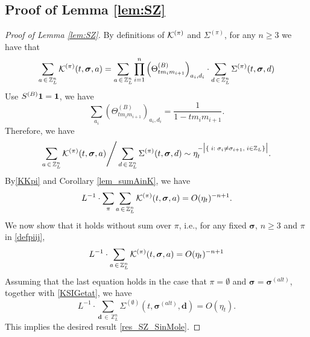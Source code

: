 \documentclass[10pt,reqno]{article}
\theoremstyle{plain} %
\theoremstyle{remark}
\numberwithin{equation}{section}
\begin{document}
\subsection{Proof of Lemma  \ref{lem:SZ}}



\begin{proof}[ Proof of Lemma  \ref{lem:SZ}]
By   definitions of ${\cal K}^{(\pi)}$ and $\Sigma^{(\pi)}$, for any $n\ge 3$ we have that 
\begin{equation} 
 \sum_{\textbf{a}\,\in \,\mathbb Z^{n}_L } 
{\cal K}^{(\pi)}(t, \boldsymbol{\sigma}, \textbf{a})
= \sum_{\textbf{a}\,\in \,\mathbb Z^{n}_L }  \prod_{i=1}^n \left(\Theta^{(B)}_{tm_im_{i+1}}\right)_{a_i,d_i}\cdot\sum_{\textbf{d}\,\in \,\mathbb Z^{n}_L } \Sigma^{(\pi)}(t, \boldsymbol{\sigma}, \textbf{d})    
\end{equation}
Use $S^{(B)} \bf 1 = \bf 1$,  we have  
$$
\sum_{a_i}\left(\Theta^{(B)}_{tm_im_{i+1}}\right)_{a_i,d_i}=\frac{1}{1-tm_im_{i+1}}.
$$
Therefore, we have 
\begin{equation}\label{KSIGetat}
 \sum_{\textbf{a}\,\in \,\mathbb Z^{n}_L } 
{\cal K}^{(\pi)}(t, \boldsymbol{\sigma}, \textbf{a})
 \Bigg/\sum_{\textbf{d}\,\in \,\mathbb Z^{n}_L } \Sigma^{(\pi)}(t, \boldsymbol{\sigma}, \textbf{d})    \sim \eta_t^{-\big|\{\;i: \;\sigma_i\ne \sigma_{i+1}, \; i\in \mathbb Z_L\}\big|}  .
\end{equation}
By\eqref{KKpi} and   Corollary \ref{lem_sumAinK}, we have  
\begin{align}\label{LKsigm0}
 L^{-1}\cdot \sum_{\pi}\sum_{\textbf{a}\,\in \,\mathbb Z^{n}_L } 
{\cal K}^{(\pi)}(t, \boldsymbol{\sigma}, \textbf{a})= O(\eta_t)^{-n+1}.
\end{align}
We now  show that it holds without sum over $\pi$, i.e.,    for  any fixed $\boldsymbol{\sigma}$, $n\ge 3$ and   $\pi$   in \eqref{defpiij}, 
\begin{align}\label{LKsigmas}
 L^{-1}\cdot \sum_{\textbf{a}\,\in \,\mathbb Z^{n}_L } 
{\cal K}^{(\pi)}(t, \boldsymbol{\sigma}, \textbf{a})=O (\eta_t)^{-n+1}  
\end{align}
Assuming that  the last equation  holds in the case that
$\pi=\emptyset$ and $\boldsymbol{\sigma}=\boldsymbol{\sigma}^{(alt)}$, 
  together with \eqref{KSIGetat},   we have 
\begin{equation}
   L^{-1} \cdot \sum_{\textbf{d}\,\in \,\mathbb Z^{n}_L } \Sigma^{(\emptyset)}(t, \boldsymbol{\sigma}^{(alt)}, \textbf{d}) =O(\eta_t).
\end{equation}
This  implies the desired result \eqref{res_SZ_SinMole}. 


\end{proof}
\end{document}
